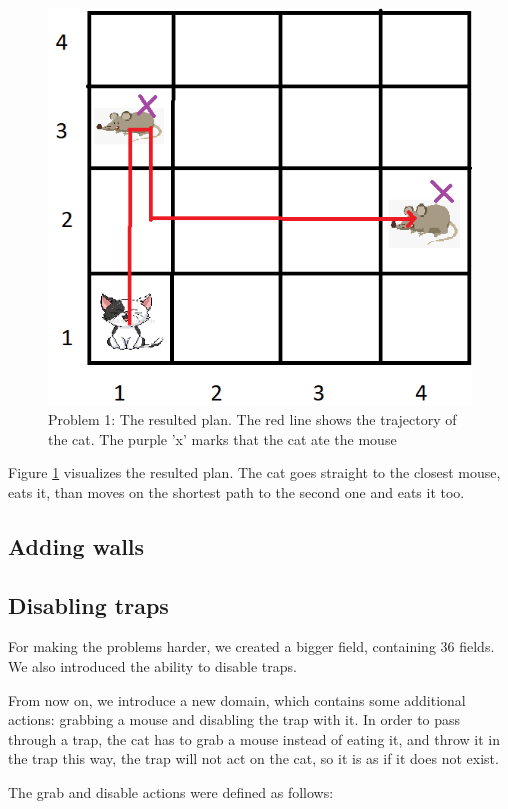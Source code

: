 \begin{figure}[ht]
    \centering
    \includegraphics[width=.5\linewidth]{fig/A3/cat_01_sol.png}
    \caption{Problem 1: The resulted plan. The red line shows the trajectory of the cat. The purple 'x' marks that the cat ate the mouse}
    \label{fig:cat_01_sol}
\end{figure}

Figure \ref{fig:cat_01_sol} visualizes the resulted plan. The cat goes straight to the closest mouse, eats it, than moves on the shortest path to the second one and eats it too.






\subsection{Adding walls}












\subsection{Disabling traps}

For making the problems harder, we created a bigger field, containing 36 fields. We also introduced the ability to disable traps.

From now on, we introduce a new domain, which contains some additional actions: grabbing a mouse and disabling the trap with it.
In order to pass through a trap, the cat has to grab a mouse instead of eating it, and throw it in the trap this way, the trap will not act on the cat, so it is as if it does not exist. 

The grab and disable actions were defined as follows:


